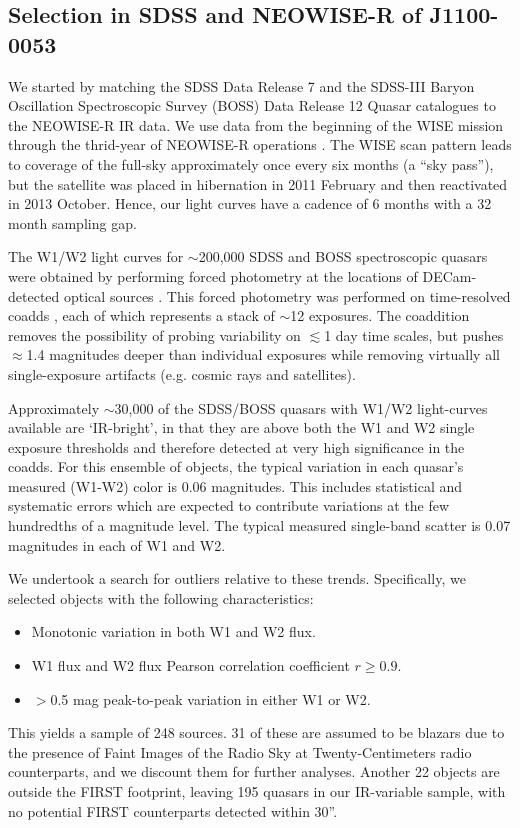 \documentclass[a4paper,fleqn,usenatbib]{mnras}
\begin{document}
\subsection{Selection in SDSS and NEOWISE-R of J1100-0053}
We started by matching the SDSS Data Release 7 \cite[DR7Q;
][]{Schneider2007} and the SDSS-III Baryon Oscillation Spectroscopic
Survey (BOSS) Data Release 12 Quasar catalogues \cite[DR12Q;
][]{Paris2017} to the NEOWISE-R IR data. We use data from the
beginning of the WISE mission \citep[2010 January; ][]{Wright2010}
through the thrid-year of NEOWISE-R operations \citep[2016 December;
][]{Mainzer2011}. The WISE scan pattern leads to coverage of the
full-sky approximately once every six months (a ``sky pass''), but the
satellite was placed in hibernation in 2011 February and then
reactivated in 2013 October. Hence, our light curves have a cadence of
6 months with a 32 month sampling gap.

The W1/W2 light curves for $\sim$200,000 SDSS and BOSS spectroscopic
quasars were obtained by performing forced photometry at the locations
of DECam-detected optical sources \citep{Lang2014, Meisner2017a,
Meisner2017b}. This forced photometry was performed on time-resolved
coadds \citep{Lang2014}, each of which represents a stack of $\sim$12
exposures. The coaddition removes the possibility of probing
variability on $\lesssim$1 day time scales, but pushes $\approx$1.4
magnitudes deeper than individual exposures while removing virtually
all single-exposure artifacts (e.g. cosmic rays and satellites).

Approximately $\sim$30,000 of the SDSS/BOSS quasars with W1/W2
light-curves available are `IR-bright', in that they are above both
the W1 and W2 single exposure thresholds and therefore detected at
very high significance in the coadds. For this ensemble of objects,
the typical variation in each quasar's measured (W1-W2) color is 0.06
magnitudes.  This includes statistical and systematic errors which are
expected to contribute variations at the few hundredths of a magnitude
level. The typical measured single-band scatter is 0.07 magnitudes in
each of W1 and W2.

We undertook a search for outliers relative to these
trends. Specifically, we selected objects with the following
characteristics:
\begin{itemize}
  \item Monotonic variation in both W1 and W2 flux.
  \item W1 flux and W2 flux Pearson correlation coefficient $r \geq0.9$.
  \item $>$0.5 mag peak-to-peak variation in either W1 or W2.
\end{itemize}
This yields a sample of 248 sources. 31 of these are assumed to be
blazars due to the presence of Faint Images of the Radio Sky at
Twenty-Centimeters \citep[FIRST; ][]{Becker1995} radio counterparts,
and we discount them for further analyses. Another 22 objects are
outside the FIRST footprint, leaving 195 quasars in our IR-variable
sample, with no potential FIRST counterparts detected within 30''. 
\end{document}
